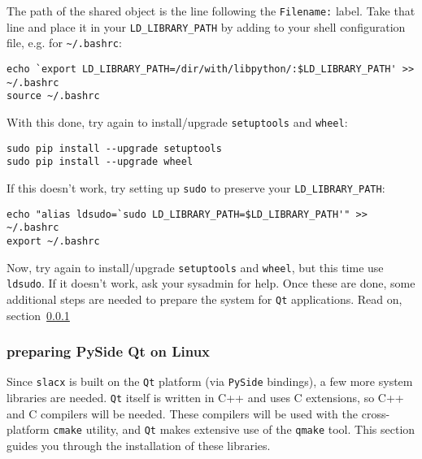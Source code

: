 The path of the shared object is the line following the \verb|Filename:| label.
Take that line and place it in your \verb|LD_LIBRARY_PATH| 
by adding to your shell configuration file, 
e.g. for \verb|~/.bashrc|:
\begin{lstlisting}
echo `export LD_LIBRARY_PATH=/dir/with/libpython/:$LD_LIBRARY_PATH' >> ~/.bashrc
source ~/.bashrc
\end{lstlisting}

With this done, try again to install/upgrade \verb|setuptools| and \verb|wheel|:
\begin{lstlisting}
sudo pip install --upgrade setuptools 
sudo pip install --upgrade wheel 
\end{lstlisting}
If this doesn't work, try setting up \verb|sudo| to preserve your \verb|LD_LIBRARY_PATH|:
\begin{lstlisting}
echo "alias ldsudo=`sudo LD_LIBRARY_PATH=$LD_LIBRARY_PATH'" >> ~/.bashrc
export ~/.bashrc
\end{lstlisting}

Now, try again to install/upgrade \verb|setuptools| and \verb|wheel|,
but this time use \verb|ldsudo|.
If it doesn't work, ask your sysadmin for help.
Once these are done, some additional steps are needed
to prepare the system for \verb|Qt| applications.
Read on, section~\ref{subsubsec:pyside_linux}


\subsubsection{preparing PySide Qt on Linux}
\label{subsubsec:pyside_linux}

Since \verb|slacx| is built on the \verb|Qt| platform 
(via \verb|PySide| bindings),
a few more system libraries are needed.
\verb|Qt| itself is written in C++
and uses C extensions,
so C++ and C compilers will be needed.
These compilers will be used with the 
cross-platform \verb|cmake| utility,
and \verb|Qt| makes extensive use of the \verb|qmake| tool.
This section guides you through the installation of these libraries.

